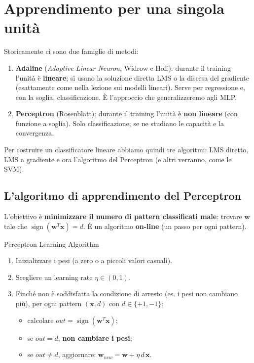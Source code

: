 \section{Apprendimento per una singola
unità}\label{apprendimento-per-una-singola-unituxe0}

Storicamente ci sono due famiglie di metodi:

\begin{enumerate}
\def\labelenumi{\arabic{enumi}.}
\tightlist
\item
  \textbf{Adaline} (\emph{Adaptive Linear Neuron}, Widrow e Hoff):
  durante il training l'unità è \textbf{lineare}; si usano la soluzione
  diretta LMS o la discesa del gradiente (esattamente come nella lezione
  sui modelli lineari). Serve per regressione e, con la soglia,
  classificazione. È l'approccio che generalizzeremo agli MLP.
\item
  \textbf{Perceptron} (Rosenblatt): durante il training l'unità è
  \textbf{non lineare} (con funzione a soglia). Solo classificazione; se
  ne studiano le capacità e la convergenza.
\end{enumerate}

Per costruire un classificatore lineare abbiamo quindi tre algoritmi:
LMS diretto, LMS a gradiente e ora l'algoritmo del Perceptron (e altri
verranno, come le SVM).

\subsection{L'algoritmo di apprendimento del
Perceptron}\label{lalgoritmo-di-apprendimento-del-perceptron}

L'obiettivo è \textbf{minimizzare il numero di pattern classificati
male}: trovare \(\mathbf{w}\) tale che
\(\operatorname{sign}(\mathbf{w}^T\mathbf{x}) = d\). È un algoritmo
\textbf{on-line} (un passo per ogni pattern).

\begin{boxabstract}{Perceptron Learning Algorithm}

\begin{enumerate}
\def\labelenumi{\arabic{enumi}.}
\tightlist
\item
  Inizializzare i pesi (a zero o a piccoli valori casuali).
\item
  Scegliere un learning rate \(\eta \in (0, 1)\).
\item
  Finché non è soddisfatta la condizione di arresto (es. i pesi non
  cambiano più), per ogni pattern \((\mathbf{x}, d)\) con
  \(d \in \{+1, -1\}\):

  \begin{itemize}
  \tightlist
  \item
    calcolare \(out = \operatorname{sign}(\mathbf{w}^T\mathbf{x})\);
  \item
    se \(out = d\), \textbf{non cambiare i pesi};
  \item
    se \(out \ne d\), aggiornare:
    \(\mathbf{w}_{new} = \mathbf{w} + \eta\, d\, \mathbf{x}\).
  \end{itemize}
\end{enumerate}

\end{boxabstract}

